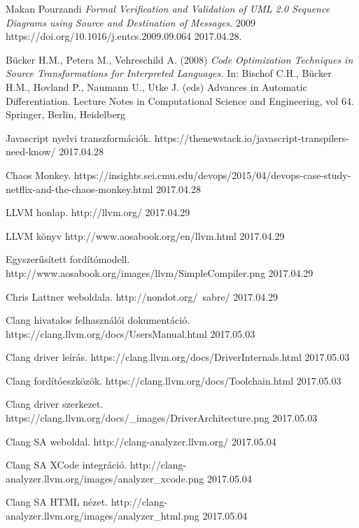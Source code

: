 \documentclass[a4paper,12pt]{report}
\begin{document}
\begin{thebibliography}{xx}

 Makan Pourzandi {\em Formal Verification and Validation of UML
2.0 Sequence Diagrams using Source and
Destination of Messages}.  2009 https://doi.org/10.1016/j.entcs.2009.09.064 2017.04.28.

 Bücker H.M., Petera M., Vehreschild A. (2008) {\em Code Optimization Techniques in Source Transformations for Interpreted Languages.} In: Bischof C.H., Bücker H.M., Hovland P., Naumann U., Utke J. (eds) Advances in Automatic Differentiation. Lecture Notes in Computational Science and Engineering, vol 64. Springer, Berlin, Heidelberg

 Javascript nyelvi transzformációk. https://thenewstack.io/javascript-transpilers-need-know/ 2017.04.28

 Chaos Monkey. https://insights.sei.cmu.edu/devops/2015/04/devops-case-study-netflix-and-the-chaos-monkey.html 2017.04.28

 LLVM honlap. http://llvm.org/ 2017.04.29

 LLVM könyv http://www.aosabook.org/en/llvm.html 2017.04.29

 Egyszerűsített fordítómodell. http://www.aosabook.org/images/llvm/SimpleCompiler.png 2017.04.29

 Chris Lattner weboldala. http://nondot.org/~sabre/ 2017.04.29

 Clang hivatalos felhasználói dokumentáció. https://clang.llvm.org/docs/UsersManual.html 2017.05.03

 Clang driver leírás. https://clang.llvm.org/docs/DriverInternals.html 2017.05.03

 Clang fordítóeszközök. https://clang.llvm.org/docs/Toolchain.html 2017.05.03

 Clang driver szerkezet. https://clang.llvm.org/docs/\_images/DriverArchitecture.png 2017.05.03

 Clang SA weboldal. http://clang-analyzer.llvm.org/ 2017.05.04

 Clang SA XCode integráció. http://clang-analyzer.llvm.org/images/analyzer\_xcode.png 2017.05.04

 Clang SA HTML nézet. http://clang-analyzer.llvm.org/images/analyzer\_html.png 2017.05.04


\end{thebibliography}
\end{document}
